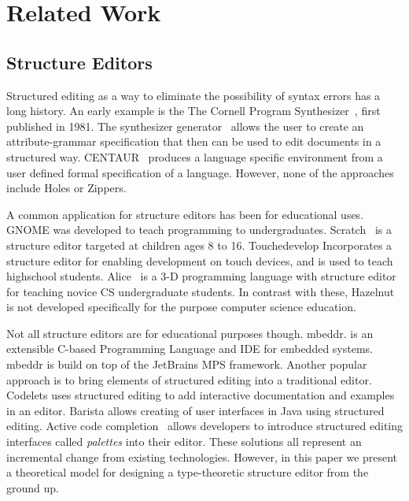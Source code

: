 \documentclass{llncs}
\begin{document}
\section{Related Work}\label{sec:rw}
\subsection{Structure Editors}

Structured editing as a way to eliminate the possibility of syntax errors has a long history.  An early example is the
The Cornell Program Synthesizer~\cite{teitelbaum_cornell_1981}, first published in 1981.
The synthesizer generator~\cite{Reps:1984:SG:390010.808247} allows the user to create an attribute-grammar specification that then can be used to edit documents in a structured way.
CENTAUR~\cite{Borras:1988:CS:64140.65005} produces a language specific environment from a user defined formal specification of a language.  However, none of the approaches include Holes or Zippers.


A common application for structure editors has been for educational uses.
GNOME\cite{garlan_gnome:_1984} was developed to teach programming to undergraduates.
Scratch~\cite{Resnick:2009:SP:1592761.1592779} is a structure editor targeted at children ages 8 to 16.
Touchedevelop \cite{tillmann_touchdevelop:_2011} Incorporates a structure editor for enabling development on touch devices, and is used to teach highschool students.
Alice~\cite{Conway:2000:ALL:332040.332481} is a 3-D programming language with structure editor for teaching novice CS undergraduate students.
In contrast with these, Hazelnut is not developed specifically for the purpose computer science education.

Not all structure editors are for educational purposes though.
mbeddr. \cite{voelter_mbeddr:_2012} is an extensible C-based Programming Language and IDE for embedded systems.
mbeddr is build on top of the JetBrains MPS framework.
Another popular approach is to bring elements of structured editing into a traditional editor.
Codelets \cite{oney_codelets:_2012} uses structured editing to add interactive documentation and examples in an editor.
Barista\cite{ko_barista:_2006} allows creating of user interfaces in Java using structured editing.
Active code completion~\cite{Omar:2012:ACC:2337223.2337324} allows developers to introduce structured editing interfaces called  \emph{palettes} into their editor.
These solutions all represent an incremental change from existing technologies.  However, in this paper we present a theoretical model for designing a type-theoretic structure editor from the ground up.
\end{document}
